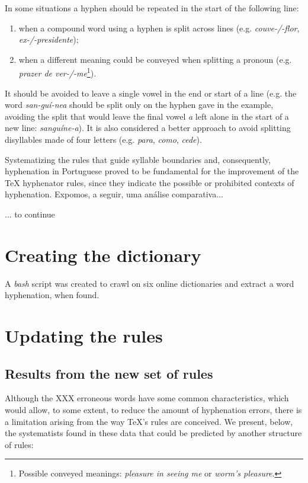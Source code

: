 \documentclass{article}
\begin{document}
In some situations a hyphen should be repeated in the start of the following
line: 
\begin{enumerate}
\item when a compound word using a hyphen is split across lines (e.g.
    \emph{couve-/-flor}, \emph{ex-/-presidente});
\item when a different meaning could be conveyed when splitting a pronoun (e.g.
    \emph{prazer de ver-/-me}\footnote{Possible conveyed meanings: 
    \emph{pleasure in seeing me} or \emph{worm's pleasure}.}). 
\end{enumerate}

It should be avoided to leave a single vowel in the end or start of a line (e.g.
the word \emph{san-guí-nea} should be split only on the hyphen gave in the
example, avoiding the split that would leave the final vowel \emph{a}
left alone in the start of a new line: \emph{sanguíne-a}). It is also considered a better approach
to avoid splitting disyllables made of four letters (e.g. \emph{para},
\emph{como}, \emph{cede}).


Systematizing the rules that guide syllable boundaries and, consequently,
hyphenation in Portuguese proved to be fundamental for the improvement of the
\TeX{} hyphenator rules, since they indicate the possible or prohibited contexts
of hyphenation. Expomos, a seguir, uma análise comparativa...

... to continue
\vspace{10ex}



\section{Creating the dictionary}
A \emph{bash} script was created to crawl on six online dictionaries and extract a word hyphenation, when found. 



\section{Updating the rules}


\subsection{Results from the new set of rules}
Although the XXX erroneous words have some common characteristics, which would
allow, to some extent, to reduce the amount of hyphenation errors, there is a
limitation arising from the way \TeX{}'s rules are conceived. We present,
below, the systematists found in these data that could be predicted by another
structure of rules:
\end{document}
